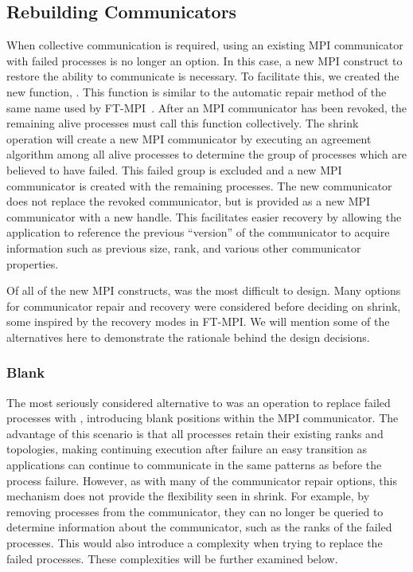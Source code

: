 
\subsection{Rebuilding Communicators}\label{subsec:ulfm:rebuild}

When collective communication is required, using an existing MPI communicator
with failed processes is no longer an option. In this case, a new MPI construct
to restore the ability to communicate is necessary. To facilitate this, we
created the new function, . This function is similar
to the automatic repair method of the same name used by FT-MPI~\cite{FaggFTMPI}. 
After an MPI communicator has been revoked, the remaining alive processes must 
call this function collectively. The shrink operation will create a new MPI 
communicator by executing an agreement algorithm among all alive processes to 
determine the group of processes which are believed to have failed. This failed 
group is excluded and a new MPI communicator is created with the remaining 
processes. The new communicator does not replace the revoked communicator, but 
is provided as a new MPI communicator with a new handle. This facilitates easier 
recovery by allowing the application to reference the previous ``version'' of 
the communicator to acquire information such as previous size, rank, and various 
other communicator properties.

Of all of the new MPI constructs,  was the most
difficult to design. Many options for communicator repair and recovery were
considered before deciding on shrink, some inspired by the recovery modes in
FT-MPI. We will mention some of the alternatives here to demonstrate the
rationale behind the design decisions.

\subsubsection{Blank}\label{subsubsec:ulfm:rebuild:blank}

The most seriously considered alternative to  was an
operation to replace failed processes with ,
introducing blank positions within the MPI communicator. The advantage of this
scenario is that all processes retain their existing ranks and topologies,
making continuing execution after failure an easy transition as applications can
continue to communicate in the same patterns as before the process failure.
However, as with many of the communicator repair options, this mechanism does
not provide the flexibility seen in shrink. For example, by removing processes
from the communicator, they can no longer be queried to determine information
about the communicator, such as the ranks of the failed processes. This would also introduce a complexity when trying to replace the failed processes. These complexities will be further examined below.

